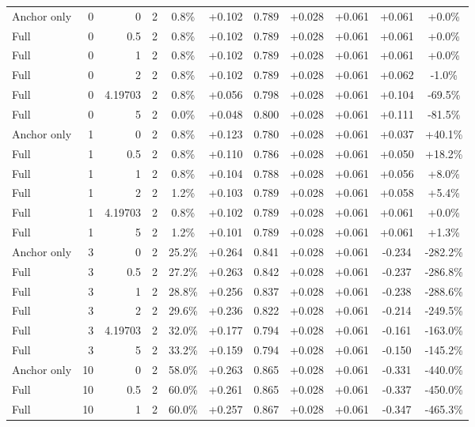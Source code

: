\begin{table}[htbp]
\begin{tabular}{lrrrccccccc}
Anchor only & 0 & 0 & 2 & 0.8\% & +0.102 & 0.789 & +0.028 & +0.061 & +0.061 & +0.0\% \\
Full & 0 & 0.5 & 2 & 0.8\% & +0.102 & 0.789 & +0.028 & +0.061 & +0.061 & +0.0\% \\
Full & 0 & 1 & 2 & 0.8\% & +0.102 & 0.789 & +0.028 & +0.061 & +0.061 & +0.0\% \\
Full & 0 & 2 & 2 & 0.8\% & +0.102 & 0.789 & +0.028 & +0.061 & +0.062 & -1.0\% \\
Full & 0 & 4.19703 & 2 & 0.8\% & +0.056 & 0.798 & +0.028 & +0.061 & +0.104 & -69.5\% \\
Full & 0 & 5 & 2 & 0.0\% & +0.048 & 0.800 & +0.028 & +0.061 & +0.111 & -81.5\% \\
Anchor only & 1 & 0 & 2 & 0.8\% & +0.123 & 0.780 & +0.028 & +0.061 & +0.037 & +40.1\% \\
Full & 1 & 0.5 & 2 & 0.8\% & +0.110 & 0.786 & +0.028 & +0.061 & +0.050 & +18.2\% \\
Full & 1 & 1 & 2 & 0.8\% & +0.104 & 0.788 & +0.028 & +0.061 & +0.056 & +8.0\% \\
Full & 1 & 2 & 2 & 1.2\% & +0.103 & 0.789 & +0.028 & +0.061 & +0.058 & +5.4\% \\
Full & 1 & 4.19703 & 2 & 0.8\% & +0.102 & 0.789 & +0.028 & +0.061 & +0.061 & +0.0\% \\
Full & 1 & 5 & 2 & 1.2\% & +0.101 & 0.789 & +0.028 & +0.061 & +0.061 & +1.3\% \\
Anchor only & 3 & 0 & 2 & 25.2\% & +0.264 & 0.841 & +0.028 & +0.061 & -0.234 & -282.2\% \\
Full & 3 & 0.5 & 2 & 27.2\% & +0.263 & 0.842 & +0.028 & +0.061 & -0.237 & -286.8\% \\
Full & 3 & 1 & 2 & 28.8\% & +0.256 & 0.837 & +0.028 & +0.061 & -0.238 & -288.6\% \\
Full & 3 & 2 & 2 & 29.6\% & +0.236 & 0.822 & +0.028 & +0.061 & -0.214 & -249.5\% \\
Full & 3 & 4.19703 & 2 & 32.0\% & +0.177 & 0.794 & +0.028 & +0.061 & -0.161 & -163.0\% \\
Full & 3 & 5 & 2 & 33.2\% & +0.159 & 0.794 & +0.028 & +0.061 & -0.150 & -145.2\% \\
Anchor only & 10 & 0 & 2 & 58.0\% & +0.263 & 0.865 & +0.028 & +0.061 & -0.331 & -440.0\% \\
Full & 10 & 0.5 & 2 & 60.0\% & +0.261 & 0.865 & +0.028 & +0.061 & -0.337 & -450.0\% \\
Full & 10 & 1 & 2 & 60.0\% & +0.257 & 0.867 & +0.028 & +0.061 & -0.347 & -465.3\% \\

\end{tabular}
\end{table}
